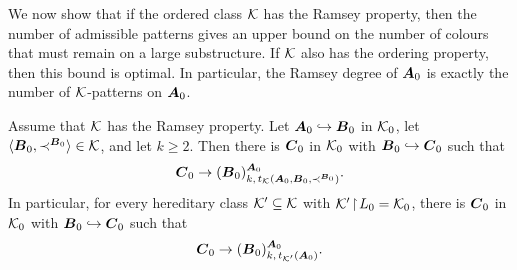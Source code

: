 We now show that if the ordered class \(\mathcal{K}\) has the Ramsey property, then the number of admissible patterns gives an upper bound on the number of colours that must remain on a large substructure. If \(\mathcal{K}\) also has the ordering property, then this bound is optimal. In particular, the Ramsey degree of \(\boldsymbol{A}_0\) is exactly the number of \(\mathcal{K}\)-patterns on \(\boldsymbol{A}_0\).

\begin{proposition}
    \label{prop:ramsey-expansion-upper-bound}
    Assume that \(\mathcal{K}\) has the Ramsey property. Let
    \(\boldsymbol{A}_0\hookrightarrow\boldsymbol{B}_0\) in \(\mathcal{K}_0\), let
    \(\langle \boldsymbol{B}_0,\prec^{\boldsymbol{B}_0}\rangle\in\mathcal{K}\), and let \(k\geq 2\). Then there
    is \(\boldsymbol{C}_0\) in \(\mathcal{K}_0\) with \(\boldsymbol{B}_0\hookrightarrow\boldsymbol{C}_0\) such that
    \[
        \boldsymbol{C}_0\to(\boldsymbol{B}_0)^{\boldsymbol{A}_0}_{k,\,t_{\mathcal{K}}(\boldsymbol{A}_0,\boldsymbol{B}_0,\prec^{\boldsymbol{B}_0})}.
    \]
    In particular, for every hereditary class \(\mathcal{K}'\subseteq\mathcal{K}\) with
    \(\mathcal{K}'\!\restriction\!L_0=\mathcal{K}_0\), there is \(\boldsymbol{C}_0\) in \(\mathcal{K}_0\) with
    \(\boldsymbol{B}_0\hookrightarrow\boldsymbol{C}_0\) such that
    \[
        \boldsymbol{C}_0\to(\boldsymbol{B}_0)^{\boldsymbol{A}_0}_{k,\,t_{\mathcal{K}'}(\boldsymbol{A}_0)}.
    \]
\end{proposition}

